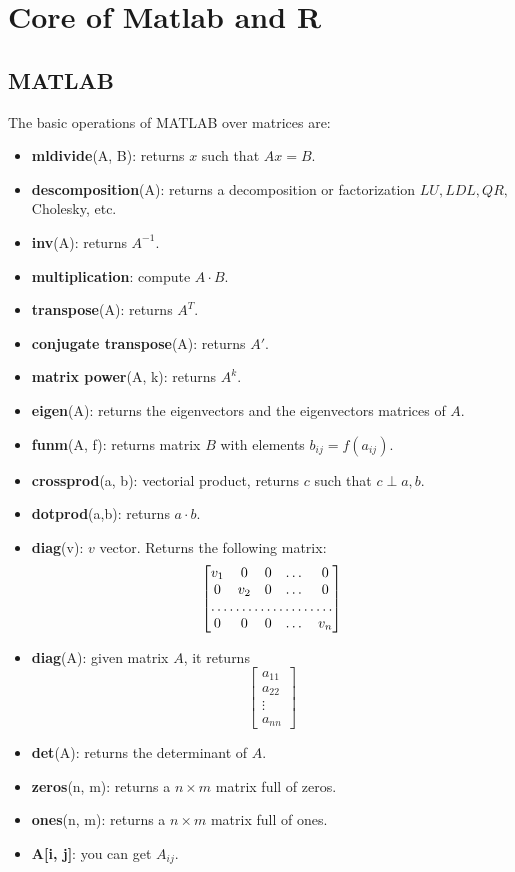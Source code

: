 \section{Core of Matlab and R}

\subsection*{MATLAB}

The basic operations of MATLAB over matrices are:

\begin{itemize}
	\item \textbf{mldivide}(A, B): returns $x$ such that $Ax=B$.
	\item \textbf{descomposition}(A): returns a decomposition or factorization $LU, LDL, QR,$ Cholesky, etc.
	\item \textbf{inv}(A): returns $A^{-1}$.
	\item \textbf{multiplication}: compute $A\cdot B$.
	\item \textbf{transpose}(A): returns $A^T$.
	\item \textbf{conjugate transpose}(A): returns $A'$.
	\item \textbf{matrix power}(A, k): returns $A^k$.
	\item \textbf{eigen}(A): returns the eigenvectors and the eigenvectors matrices of $A$.
	\item \textbf{funm}(A, f): returns matrix $B$ with elements $b_{ij}=f(a_{ij})$.
	\item \textbf{crossprod}(a, b): vectorial product, returns $c$ such that $c\perp a, b.$
	\item \textbf{dotprod}(a,b): returns $a\cdot b$.
	\item \textbf{diag}(v): $v$ vector. Returns the following matrix: 
	\[
\begin{bmatrix}
    v_{1}       & 0 & 0 & \dots & 0 \\
    0       & v_{2} & 0 & \dots & 0 \\
    \hdotsfor{5} \\
    0       & 0 & 0 & \dots & v_{n}
\end{bmatrix}
\]
	\item \textbf{diag}(A): given matrix $A$, it returns
	\[
\begin{bmatrix}
    a_{11} \\
    a_{22} \\
    \vdots \\
    a_{nn}
\end{bmatrix}
\]
	\item \textbf{det}(A): returns the determinant of $A$.
	\item \textbf{zeros}(n, m): returns a $n\times m$ matrix full of zeros.
	\item \textbf{ones}(n, m): returns a $n\times m$ matrix full of ones.
	\item \textbf{A[i, j]}: you can get $A_{ij}$.
\end{itemize}

